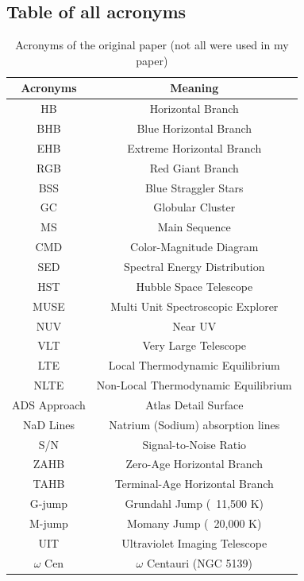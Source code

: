 \documentclass{aa}
\begin{document}
\begin{appendix}

\section{Table of all acronyms}

\begin{table}[!h]
\caption{Acronyms of the original paper (not all were used in my paper)}                 %
\label{table:1}    %
\centering                        %
\onecolumn
\begin{tabular}{c c}      %
\hline\hline               %
Acronyms  & Meaning  \\         %
\hline                      %
HB & Horizontal Branch \\
BHB & Blue Horizontal Branch \\
EHB & Extreme Horizontal Branch \\
RGB & Red Giant Branch \\
BSS  & Blue Straggler Stars	\\
GC & Globular Cluster \\
MS & Main Sequence \\
CMD & Color-Magnitude Diagram \\
SED & Spectral Energy Distribution \\
HST & Hubble Space Telescope \\
MUSE & Multi Unit Spectroscopic Explorer \\
NUV & Near UV \\
VLT & Very Large Telescope \\
LTE & Local Thermodynamic Equilibrium \\
NLTE & Non-Local Thermodynamic Equilibrium \\
ADS Approach & Atlas Detail Surface \\
NaD Lines & Natrium (Sodium) absorption lines \\
S/N & Signal-to-Noise Ratio \\
ZAHB & Zero-Age Horizontal Branch \\
TAHB & Terminal-Age Horizontal Branch \\
G-jump & Grundahl Jump (~11,500 K) \\
M-jump & Momany Jump (~20,000 K) \\
UIT & Ultraviolet Imaging Telescope \\
$\omega$ Cen & $\omega$ Centauri (NGC 5139)\\

\hline                                  %
\end{tabular}
\end{table}
\end{appendix}
\end{document}
